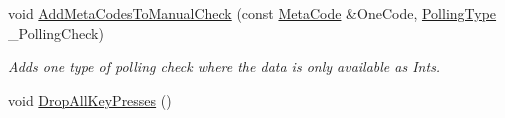 \begin{DoxyCompactItemize}
void \hyperlink{structMezzanine_1_1internal_1_1EventManagerInternalData_a19c57d0654711e2b3abeadb42bcaaa47}{AddMetaCodesToManualCheck} (const \hyperlink{classMezzanine_1_1MetaCode}{MetaCode} \&OneCode, \hyperlink{structMezzanine_1_1internal_1_1EventManagerInternalData_a4179a167c7f67babd5aa4902dc279027}{PollingType} \_\-PollingCheck)
\begin{DoxyCompactList}\small\item\em Adds one type of polling check where the data is only available as Ints. \item\end{DoxyCompactList}\item 
\hypertarget{structMezzanine_1_1internal_1_1EventManagerInternalData_aa1da2f0cd037bfb5013a1e7ca5844ca0}{
void \hyperlink{structMezzanine_1_1internal_1_1EventManagerInternalData_aa1da2f0cd037bfb5013a1e7ca5844ca0}{DropAllKeyPresses} ()}
\label{structMezzanine_1_1internal_1_1EventManagerInternalData_aa1da2f0cd037bfb5013a1e7ca5844ca0}


\end{DoxyCompactItemize}
